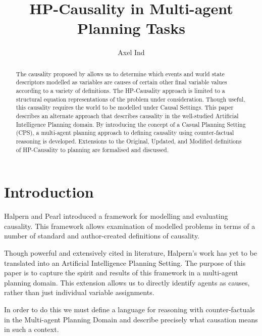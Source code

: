 \documentclass{article}
\theoremstyle{plain}
\theoremstyle{definition}
\begin{document}
\title{HP-Causality in Multi-agent Planning Tasks}
\author{Axel Ind}

\maketitle

\begin{abstract}
The causality proposed by \cite{halpern2005causes} allows us to determine which events and world state descriptors modelled as variables are causes of certain other final variable values according to a variety of definitions. The HP-Causality approach is limited to a structural equation representations of the problem under consideration. Though useful, this causality requires the world to be modelled under Causal Settings. This paper describes an alternate approach that describes causality in the well-studied Artificial Intelligence Planning domain. By introducing the concept of a Casual Planning Setting (CPS), a multi-agent planning approach to defining causality using counter-factual reasoning is developed. Extensions to the Original, Updated, and Modified definitions of HP-Causality to planning are formalised and discussed.
\end{abstract}

\section{Introduction} \label{sec:introduction}

Halpern and Pearl \cite{halpern2005causes} introduced a framework for modelling and evaluating causality. This framework allows examination of modelled problems in terms of a number of standard and author-created definitions of causality.

Though powerful and extensively cited in literature, Halpern's work has yet to be translated into an Artificial Intelligence Planning Setting. The purpose of this paper is to capture the spirit and results of this framework in a multi-agent planning domain. This extension allows us to directly identify agents as causes, rather than just individual variable assignments.

In order to do this we must define a language for reasoning with counter-factuals in the Multi-agent Planning Domain and describe precisely what causation means in such a context.
\end{document}

